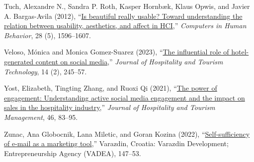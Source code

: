 \documentclass[
  12pt,
  letterpaper,
  DIV=11,
  numbers=noendperiod]{scrartcl}
\newlength{\cslhangindent}
\newenvironment{CSLReferences}[2] %
 {\begin{list}{}{%
  \setlength{\itemindent}{0pt}
  \setlength{\leftmargin}{0pt}
  \setlength{\parsep}{0pt}
  \ifodd #1
   \setlength{\leftmargin}{\cslhangindent}
   \setlength{\itemindent}{-1\cslhangindent}
  \fi
  \setlength{\itemsep}{#2\baselineskip}}}
 {\end{list}}
\begin{document}
\begin{CSLReferences}{1}{0}
Tuch, Alexandre N., Sandra P. Roth, Kasper Hornbæk, Klaus Opwis, and
Javier A. Bargas-Avila (2012),
{``\href{https://doi.org/10.1016/j.chb.2012.03.024}{Is beautiful really
usable? Toward understanding the relation between usability, aesthetics,
and affect in HCI},''} \emph{Computers in Human Behavior}, 28 (5),
1596--1607.

Veloso, Mónica and Monica Gomez-Suarez (2023),
{``\href{https://doi.org/10.1108/JHTT-08-2021-0241}{The influential role
of hotel-generated content on social media},''} \emph{Journal of
Hospitality and Tourism Technology}, 14 (2), 245--57.

Yost, Elizabeth, Tingting Zhang, and Ruoxi Qi (2021),
{``\href{https://doi.org/10.1016/j.jhtm.2020.10.008}{The power of
engagement: Understanding active social media engagement and the impact
on sales in the hospitality industry},''} \emph{Journal of Hospitality
and Tourism Management}, 46, 83--95.

Zunac, Ana Globocnik, Lana Miletic, and Goran Kozina (2022),
{``\href{https://www.proquest.com/docview/2735560511/abstract/A22D6AB6B6984192PQ/10}{Self-sufficiency
of e-mail as a marketing tool},''} Varazdin, Croatia: Varazdin
Development; Entrepreneurship Agency (VADEA), 147--53.

\end{CSLReferences}
\end{document}
